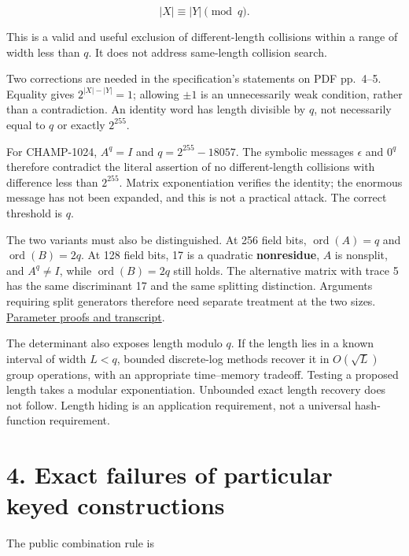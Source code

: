 \documentclass[
  english,
  11pt,
  a4paper,
]{article}
\begin{document}
\[
|X|\equiv |Y|\pmod q.
\]

This is a valid and useful exclusion of different-length collisions
within a range of width less than \(q\). It does not address same-length
collision search.

Two corrections are needed in the specification's statements on PDF
pp.~4--5. Equality gives \(2^{|X|-|Y|}=1\); allowing \(\pm1\) is an
unnecessarily weak condition, rather than a contradiction. An identity
word has length divisible by \(q\), not necessarily equal to \(q\) or
exactly \(2^{255}\).

For CHAMP-1024, \(A^q=I\) and \(q=2^{255}-18057\). The symbolic messages
\(\epsilon\) and \(0^q\) therefore contradict the literal assertion of
no different-length collisions with difference less than \(2^{255}\).
Matrix exponentiation verifies the identity; the enormous message has
not been expanded, and this is not a practical attack. The correct
threshold is \(q\).

The two variants must also be distinguished. At 256 field bits,
\(\operatorname{ord}(A)=q\) and \(\operatorname{ord}(B)=2q\). At 128
field bits, 17 is a quadratic \textbf{nonresidue}, \(A\) is nonsplit,
and \(A^q\ne I\), while \(\operatorname{ord}(B)=2q\) still holds. The
alternative matrix with trace 5 has the same discriminant 17 and the
same splitting distinction. Arguments requiring split generators
therefore need separate treatment at the two sizes.
\href{evidence/parameters.log}{Parameter proofs and transcript}.

The determinant also exposes length modulo \(q\). If the length lies in
a known interval of width \(L<q\), bounded discrete-log methods recover
it in \(O(\sqrt L)\) group operations, with an appropriate time--memory
tradeoff. Testing a proposed length takes a modular exponentiation.
Unbounded exact length recovery does not follow. Length hiding is an
application requirement, not a universal hash-function requirement.



\section{4. Exact failures of particular keyed
constructions}\label{exact-failures-of-particular-keyed-constructions}


The public combination rule is
\end{document}
